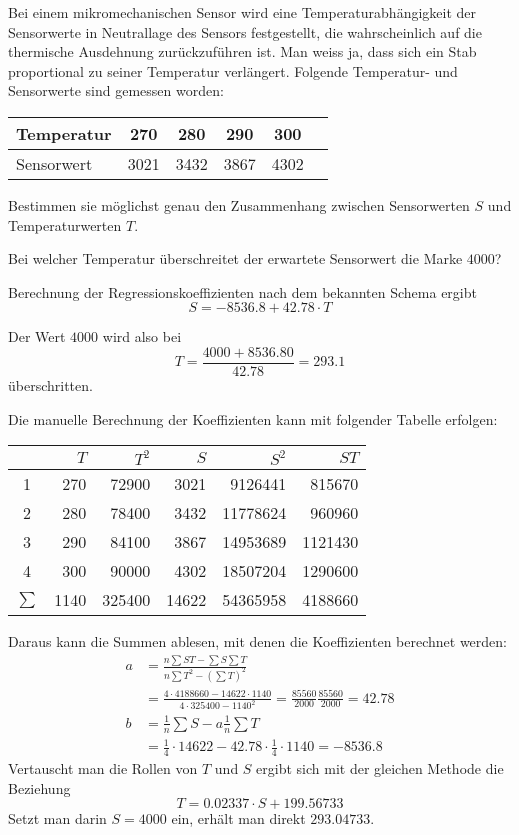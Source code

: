 Bei einem mikromechanischen Sensor wird eine Temperaturabhängigkeit
der Sensorwerte in Neutrallage des Sensors festgestellt,
die wahrscheinlich auf die thermische
Ausdehnung zurückzuführen ist. Man weiss ja, dass sich
ein Stab proportional zu seiner Temperatur verlängert. Folgende
Temperatur- und Sensorwerte sind gemessen worden:
\begin{center}
\begin{tabular}{l|c|c|c|c|c}
Temperatur&270&280&290&300\\
\hline
Sensorwert&3021&3432&3867&4302\\
\end{tabular}
\end{center}
\begin{teilaufgaben}
\item Bestimmen sie möglichst genau den Zusammenhang zwischen
Sensorwerten $S$ und Temperaturwerten $T$.
\item Bei welcher Temperatur überschreitet der erwartete Sensorwert
die Marke $4000$?
\end{teilaufgaben}


\begin{loesung}
\begin{teilaufgaben}
\item Berechnung der Regressionskoeffizienten nach dem bekannten
Schema ergibt
\[
S=-8536.8 + 42.78\cdot T
\]
\item
Der Wert $4000$ wird also bei
\[
T=\frac{4000 + 8536.80}{42.78}=293.1
\]
überschritten.
\end{teilaufgaben}
Die manuelle Berechnung der Koeffizienten kann mit folgender Tabelle
erfolgen:
\begin{center}
\begin{tabular}{|c|r|r|r|r|r|}
\hline
&$T$&$T^2$&$S$&$S^2$&$ST$\\
\hline
1&270&72900& 3021& 9126441& 815670\\
2&280&78400& 3432& 11778624& 960960\\
3&290&84100& 3867& 14953689& 1121430\\
4&300&90000& 4302& 18507204& 1290600\\
\hline
$\sum$&1140& 325400& 14622& 54365958& 4188660\\
\hline
\end{tabular}
\end{center}
Daraus kann die Summen ablesen, mit denen die Koeffizienten berechnet
werden:
\begin{align*}
a&=\frac{n\sum ST-\sum S\sum T}{n\sum T^2-(\sum T)^2}
\\
&=
\frac{
4\cdot 4188660 - 14622\cdot 1140
}{
4\cdot 325400 - 1140^2
}
=
\frac{
85560
}{
2000
}
\frac{85560}{2000}
=42.78
\\
b&=\textstyle \frac1n\sum S-a\frac1n\sum T
\\
&=
\frac14\cdot 14622-42.78\cdot\frac14\cdot 1140
=-8536.8
\end{align*}
Vertauscht man die Rollen von $T$ und $S$ ergibt sich mit der
gleichen Methode die Beziehung
\[
T=0.02337\cdot S +199.56733
\]
Setzt man darin $S=4000$ ein, erhält man direkt
$293.04733$.
\end{loesung}

